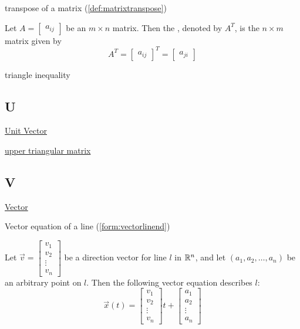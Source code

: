 \documentclass{ximera}
\begin{document}
transpose of a matrix (\ref{def:matrixtranspose})
\begin{expandable}
    Let $A=\begin{bmatrix} a _{ij}\end{bmatrix}$ be an $m\times n$ matrix. Then the , denoted by $A^{T}$, is the $n\times m$
matrix given by 
\begin{equation*}
A^{T} = \begin{bmatrix} a _{ij}\end{bmatrix}^{T}= \begin{bmatrix} a_{ji} \end{bmatrix}
\end{equation*}
\end{expandable}

triangle inequality

\subsection{U}
\href{https://ximera.osu.edu/oerlinalg/LinearAlgebra/VEC-0036/main}{Unit Vector}

\href{https://ximera.osu.edu/oerlinalg/LinearAlgebra/MAT-0070/main}{upper triangular matrix}

\subsection{V}
\href{https://ximera.osu.edu/oerlinalg/LinearAlgebra/VEC-0010/main}{Vector}

Vector equation of a line (\ref{form:vectorlinend})
\begin{expandable}
    Let $\vec{v}=\begin{bmatrix}v_1\\v_2\\\vdots\\v_n\end{bmatrix}$ be a direction vector for line $l$ in $\mathbb{R}^n$, and let $(a_1, a_2,\ldots , a_n)$ be an arbitrary point on $l$.  Then the following vector equation describes $l$:
$$\vec{x}(t)=\begin{bmatrix}v_1\\v_2\\\vdots\\v_n\end{bmatrix}t+\begin{bmatrix}a_1\\a_2\\\vdots\\a_n\end{bmatrix}$$
\end{expandable}
\end{document}
